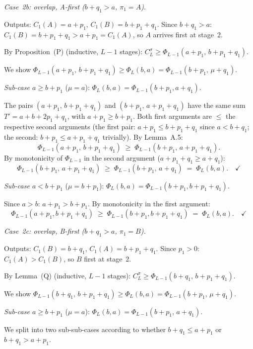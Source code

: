 \documentclass[11pt,titlepage]{article}
\begin{document}
\emph{Case~2b: overlap, A-first ($b + q_1 > a$,
  $\pi_1 = A$).}

Outputs: $C_1(A) = a + p_1$,
$C_1(B) = b + p_1 + q_1$.
Since $b + q_1 > a$: $C_1(B) = b + p_1 + q_1 >
a + p_1 = C_1(A)$, so $A$ arrives first at stage~2.

By Proposition~(P) (inductive, $L-1$ stages):
$C_L^\sigma \geq \Phi_{L-1}(a + p_1,\, b + p_1 + q_1)$.

We show $\Phi_{L-1}(a + p_1,\, b + p_1 + q_1) \geq
\Phi_L(b, a) = \Phi_{L-1}(b + p_1,\, \mu + q_1)$.

\emph{Sub-case $a \geq b + p_1$} ($\mu = a$):
$\Phi_L(b,a) = \Phi_{L-1}(b + p_1, a + q_1)$.

The pairs $(a + p_1,\, b + p_1 + q_1)$ and
$(b + p_1,\, a + p_1 + q_1)$ have the same sum
$T' = a + b + 2p_1 + q_1$, with $a + p_1 \geq b + p_1$.
Both first arguments are $\leq$ the respective second
arguments (the first pair: $a + p_1 \leq b + p_1 + q_1$
since $a < b + q_1$; the second: $b + p_1 \leq a + p_1 + q_1$
trivially). By Lemma~A.5:
\[
  \Phi_{L-1}(a + p_1,\, b + p_1 + q_1)
  \;\geq\;
  \Phi_{L-1}(b + p_1,\, a + p_1 + q_1).
\]
By monotonicity of $\Phi_{L-1}$ in the second argument
($a + p_1 + q_1 \geq a + q_1$):
\[
  \Phi_{L-1}(b + p_1,\, a + p_1 + q_1)
  \;\geq\;
  \Phi_{L-1}(b + p_1,\, a + q_1)
  \;=\; \Phi_L(b,a).
  \quad\checkmark
\]

\emph{Sub-case $a < b + p_1$} ($\mu = b + p_1$):
$\Phi_L(b,a) = \Phi_{L-1}(b + p_1, b + p_1 + q_1)$.

Since $a > b$: $a + p_1 > b + p_1$. By monotonicity in
the first argument:
\[
  \Phi_{L-1}(a + p_1, b + p_1 + q_1)
  \;\geq\;
  \Phi_{L-1}(b + p_1, b + p_1 + q_1)
  \;=\; \Phi_L(b,a).
  \quad\checkmark
\]

\emph{Case~2c: overlap, B-first ($b + q_1 > a$,
  $\pi_1 = B$).}

Outputs: $C_1(B) = b + q_1$,
$C_1(A) = b + p_1 + q_1$.
Since $p_1 > 0$: $C_1(A) > C_1(B)$, so $B$ first at
stage~2.

By Lemma~(Q) (inductive, $L-1$ stages):
$C_L^\sigma \geq \Phi_{L-1}(b + q_1,\, b + p_1 + q_1)$.

We show $\Phi_{L-1}(b + q_1,\, b + p_1 + q_1)
\geq \Phi_L(b,a) = \Phi_{L-1}(b + p_1,\, \mu + q_1)$.

\emph{Sub-case $a \geq b + p_1$} ($\mu = a$):
$\Phi_L(b,a) = \Phi_{L-1}(b + p_1,\, a + q_1)$.

We split into two sub-sub-cases according to whether
$b + q_1 \leq a + p_1$ or $b + q_1 > a + p_1$.
\end{document}
